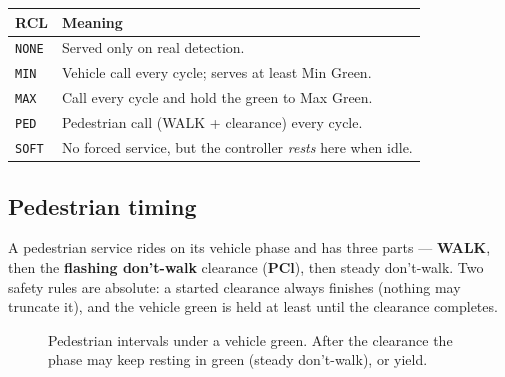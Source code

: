 \documentclass[11pt]{article}
\newcommand{\field}[1]{\textsf{\textbf{#1}}}
\begin{document}
\begin{center}\small
\begin{tabular}{@{}lp{11.2cm}@{}}
\toprule
\textbf{RCL} & \textbf{Meaning} \\
\midrule
\texttt{NONE} & Served only on real detection. \\
\texttt{MIN}  & Vehicle call every cycle; serves at least Min Green. \\
\texttt{MAX}  & Call every cycle and hold the green to Max Green. \\
\texttt{PED}  & Pedestrian call (WALK + clearance) every cycle. \\
\texttt{SOFT} & No forced service, but the controller \emph{rests} here when idle. \\
\bottomrule
\end{tabular}
\end{center}

\subsection{Pedestrian timing}\label{sec:ped}

A pedestrian service rides on its vehicle phase and has three parts —
\textbf{WALK}, then the \textbf{flashing don't-walk} clearance (\field{PCl}),
then steady don't-walk. Two safety rules are absolute: a started clearance always
finishes (nothing may truncate it), and the vehicle green is held at least until the
clearance completes.

\begin{figure}[H]
\centering
{}
\caption{Pedestrian intervals under a vehicle green. After the clearance the phase
may keep resting in green (steady don't-walk), or yield.}
\label{fig:ped}
\end{figure}
\end{document}
